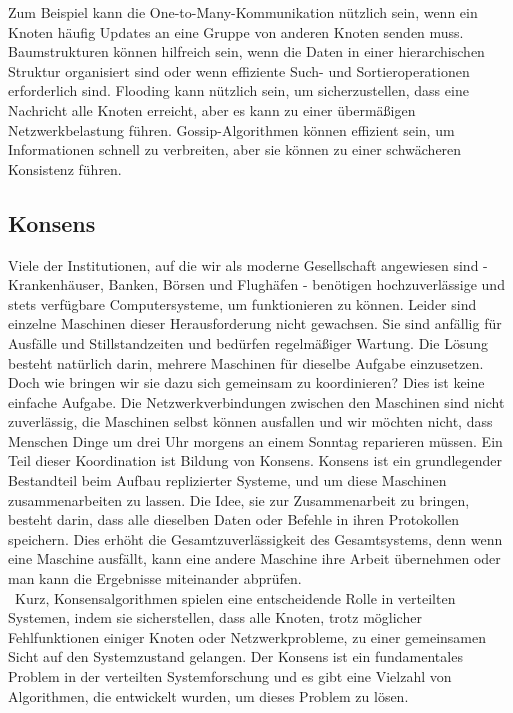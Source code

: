Zum Beispiel kann die One-to-Many-Kommunikation nützlich sein, wenn ein Knoten häufig Updates an eine Gruppe von anderen Knoten senden muss. Baumstrukturen können hilfreich sein, wenn die Daten in einer hierarchischen Struktur organisiert sind oder wenn effiziente Such- und Sortieroperationen erforderlich sind. Flooding kann nützlich sein, um sicherzustellen, dass eine Nachricht alle Knoten erreicht, aber es kann zu einer übermäßigen Netzwerkbelastung führen. Gossip-Algorithmen können effizient sein, um Informationen schnell zu verbreiten, aber sie können zu einer schwächeren Konsistenz führen.


\subsection{Konsens}

Viele der Institutionen, auf die wir als moderne Gesellschaft angewiesen sind - Krankenhäuser, Banken, Börsen und Flughäfen - benötigen hochzuverlässige und stets verfügbare Computersysteme, um funktionieren zu können. Leider sind einzelne Maschinen dieser Herausforderung nicht gewachsen. Sie sind anfällig für Ausfälle und Stillstandzeiten und bedürfen regelmäßiger Wartung. Die Lösung besteht natürlich darin, mehrere Maschinen für dieselbe Aufgabe einzusetzen. Doch wie bringen wir sie dazu sich gemeinsam zu koordinieren? Dies ist keine einfache Aufgabe. Die Netzwerkverbindungen zwischen den Maschinen sind nicht zuverlässig, die Maschinen selbst können ausfallen und wir möchten nicht, dass Menschen Dinge um drei Uhr morgens an einem Sonntag reparieren müssen. Ein Teil dieser Koordination ist Bildung von Konsens. Konsens ist ein grundlegender Bestandteil beim Aufbau replizierter Systeme, und um diese Maschinen zusammenarbeiten zu lassen. Die Idee, sie zur Zusammenarbeit zu bringen, besteht darin, dass alle dieselben Daten oder Befehle in ihren Protokollen speichern. Dies erhöht die Gesamtzuverlässigkeit des Gesamtsystems, denn wenn eine Maschine ausfällt, kann eine andere Maschine ihre Arbeit übernehmen oder man kann die Ergebnisse miteinander abprüfen.
\\\
Kurz, Konsensalgorithmen spielen eine entscheidende Rolle in verteilten Systemen, indem sie sicherstellen, dass alle Knoten, trotz möglicher Fehlfunktionen einiger Knoten oder Netzwerkprobleme, zu einer gemeinsamen Sicht auf den Systemzustand gelangen. Der Konsens ist ein fundamentales Problem in der verteilten Systemforschung und es gibt eine Vielzahl von Algorithmen, die entwickelt wurden, um dieses Problem zu lösen.


